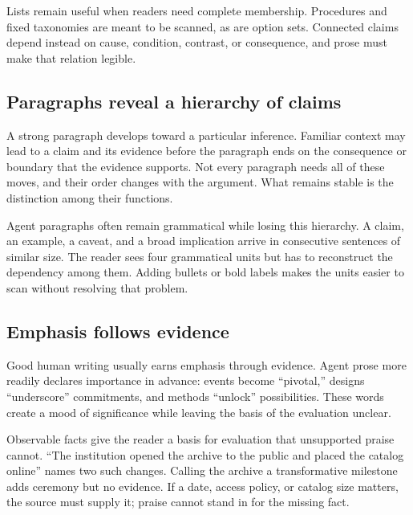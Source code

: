 Lists remain useful when readers need complete membership. Procedures and fixed
taxonomies are meant to be scanned, as are option sets. Connected claims depend
instead on cause, condition, contrast, or consequence, and prose must make that
relation legible.

\subsection{Paragraphs reveal a hierarchy of claims}

A strong paragraph develops toward a particular inference. Familiar context
may lead to a claim and its evidence before the paragraph ends on the
consequence or boundary that the evidence supports. Not every paragraph needs
all of these moves, and their order changes with the argument. What remains
stable is the distinction among their functions.

Agent paragraphs often remain grammatical while losing this hierarchy. A
claim, an example, a caveat, and a broad implication arrive in consecutive
sentences of similar size. The reader sees four grammatical units but has to
reconstruct the dependency among them. Adding bullets or bold labels makes the
units easier to scan without resolving that problem.

\subsection{Emphasis follows evidence}

Good human writing usually earns emphasis through evidence. Agent prose more
readily declares importance in advance: events become ``pivotal,'' designs
``underscore'' commitments, and methods ``unlock'' possibilities. These words
create a mood of significance while leaving the basis of the evaluation
unclear.

Observable facts give the reader a basis for evaluation that unsupported
praise cannot. ``The institution opened the archive to the public and placed
the catalog online'' names two such changes. Calling the archive a
transformative milestone adds ceremony but no evidence. If a date, access
policy, or catalog size matters, the source must supply it; praise cannot stand
in for the missing fact.
